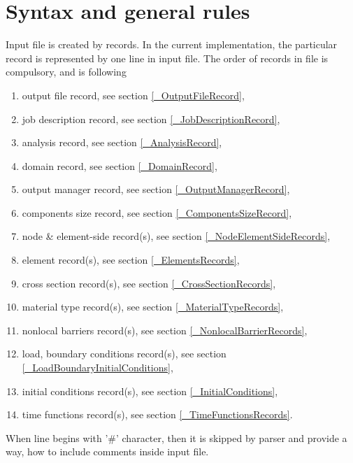 \documentclass[draft]{article}
\begin{document}
\section{Syntax and general rules}

Input file is created by records. In the current implementation, the
particular record is represented by one line in input file.
The order of records in file is
compulsory, and is following
\begin{enumerate}
\item output file record, see section \ref{_OutputFileRecord},
\item job description record, see section \ref{_JobDescriptionRecord},
\item analysis record, see section \ref{_AnalysisRecord},
\item domain record, see section \ref{_DomainRecord},
\item output manager record, see section \ref{_OutputManagerRecord},
\item components size record, see section \ref{_ComponentsSizeRecord},
\item node \& element-side  record(s), see section \ref{_NodeElementSideRecords},
\item element record(s), see section \ref{_ElementsRecords},
\item cross section record(s), see section \ref{_CrossSectionRecords},
\item material type  record(s), see section \ref{_MaterialTypeRecords},
\item nonlocal barriers record(s), see section \ref{_NonlocalBarrierRecords},
\item load, boundary  conditions record(s), see section
  \ref{_LoadBoundaryInitialConditions},
\item initial conditions record(s), see section \ref{_InitialConditions},
\item time functions record(s), see section \ref{_TimeFunctionsRecords}.
\end{enumerate} 
When line begins with '\#' character, then it is skipped by parser and
provide a way, how to include comments inside input file.
\end{document}
